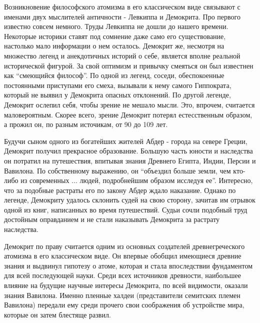 Возникновение философского атомизма в его классическом виде связывают с именами двух мыслителей античности - Левкиппа и Демокрита.
Про первого известно совсем немного.
Труды Левкиппа не дошли до нашего времени.
Некоторые историки ставят под сомнение даже само его существование, настолько мало информации о нем осталось.
Демокрит же, несмотря на множество легенд и анекдотичных историй о себе, является вполне реальной исторической фигурой. 
За свой оптимизм и привычку смеяться он был известнен как ``смеющийся философ''.
По одной из легенд, соседи, обеспокоенные постоянными приступами его смеха, вызывали к нему самого Гиппократа, который не выявил у Демокрита опасных отклонений.
По другой легенде, Демокрит ослепил себя, чтобы зрение не мешало мысли. 
Это, впрочем, считается маловероятным.
Скорее всего, зрение Демокрит потерял естесственным образом, а прожил он, по разным источикам, от 90 до 109 лет.

Будучи сыном одного из богатейших жителей Абдер - города на севере Греции, Демокрит получил прекрасное образование.
Большую часть юности и наследства он потратил на путешествия, впитывая знания Древнего Египта, Индии, Персии и Вавилона.
По собственному выражению, он ``объездил больше земли, чем кто-либо из современных ... людей, подробнейшим образом исследуя ее''.
Интересно, что за подобные растраты его по закону Абдер ждало наказание.
Однако по легенде, Демокриту удалось склонить судей на свою сторону, зачитав им отрывок одной из книг, написанных во время путешествий.
Судьи сочли подобный труд достойным оправданием и не стали наказывать Демокрита за растрату наследства. 

Демокрит по праву считается одним из основных создателей древнегреческого атомизма в его классическом виде.
Он впервые обобщил имеющиеся древние знания и выдвинул гипотезу о атоме, которая и стала впоследствии фундаментом для всей последующей науки.
Среди всех источников древности, наибольшее влияние на будущие научные интересы Демокрита, по всей видимости, оказали знания Вавилона.
Именно пленные халдеи (представители семитских племен Вавилона) передали ему среди прочего свои соображения об устройстве мира, которые он затем блестяще развил.

